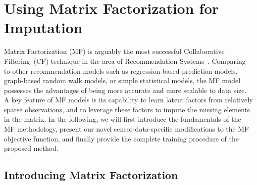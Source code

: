 \section{Using Matrix Factorization for Imputation}  \label{sec:mf}


Matrix Factorization (MF) is arguably the most successful Collaborative Filtering~(CF) technique in the area of Recommendation Systems~\cite{koren2009bellkor, piotte2009pragmatic, toscher2009bigchaos, chen2011linear}. Comparing to other recommendation models such as regression-based prediction models, graph-based random walk models, or simple statistical models, the MF model possesses the advantages of being more accurate and more scalable to data size.
A key feature of MF models is its capability to learn latent factors from relatively sparse observations, and to leverage these factors to impute the missing elements in the matrix.
In the following, we will first introduce the fundamentals of the MF methodology, present our novel sensor-data-specific 
modifications to the MF objective function, and finally provide the complete training procedure of the proposed method.

\subsection{Introducing Matrix Factorization}

